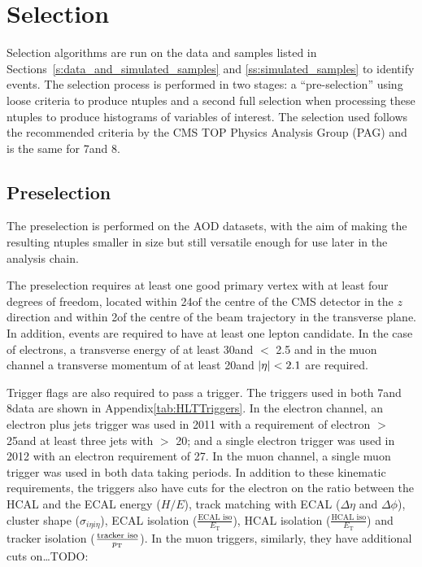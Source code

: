 






\section{Selection}
\label{s:selection}
Selection algorithms are run on the data and samples listed in Sections~\ref{s:data_and_simulated_samples} and
\ref{ss:simulated_samples} to identify \ttbar events. The selection process is performed in two stages: a
``pre-selection'' using loose criteria to produce ntuples and a second full selection when processing these
ntuples to produce histograms of variables of interest. The selection used follows the recommended criteria by
the CMS TOP Physics Analysis Group (PAG) and is the same for 7\TeV and 8\TeV.

\subsection{Preselection}
\label{ss:preselection}
The preselection is performed on the AOD datasets, with the aim of making the resulting ntuples smaller
in size but still versatile enough for use later in the analysis chain.

The preselection requires at least one good primary vertex with at least four degrees of freedom,
located within 24\cm of the centre of the CMS detector in the $z$ direction and within 2\cm of the centre of
the beam trajectory in the transverse plane. In addition, events are required to have at least one lepton
candidate. In the case of electrons, a transverse energy of at least 30\GeV and \abseta $<$ 2.5 and in the
muon channel a transverse momentum of at least 20\GeV and $|\eta| < 2.1$ are required. 

Trigger flags are also required to pass a trigger. The triggers used in both 7\TeV and 8\TeV data are shown in
Appendix\ref{tab:HLTTriggers}. In the electron channel, an electron plus jets trigger was used in 2011 with a
requirement of electron \Et $>$ 25\GeV and at least three jets with \pt $>$ 20\GeV; and a single electron
trigger was used in 2012 with an electron \Et requirement of 27\GeV. In the muon channel, a single muon
trigger was used in both data taking periods. In addition to these kinematic requirements, the triggers also
have cuts for the electron on the ratio between the HCAL and the ECAL energy ($H/E$), track matching with ECAL
($\Delta\eta$ and $\Delta\phi$), cluster shape ($\sigma_{i\eta i\eta}$), ECAL isolation ($\frac{\text{ECAL
iso}}{E_\text{T}}$), HCAL isolation ($\frac{\text{HCAL iso}}{E_\text{T}}$) and tracker isolation
($\frac{\text{tracker iso}}{p_{\mathrm{T}}}$). In the muon triggers, similarly, they have additional cuts on\ldots TODO:


